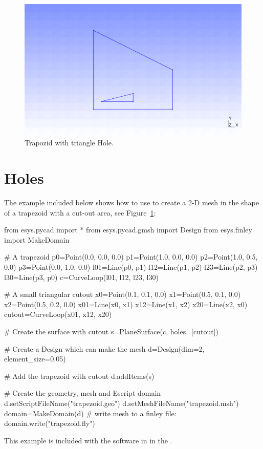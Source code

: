\begin{figure}
\centerline{\includegraphics[width=\figwidth]{figures/trap}}
\caption{Trapozid with triangle Hole.}
\label{fig:PYCAD 1}
\end{figure}


\section{Holes}
The example included below shows how to use \pycad to create a 2-D mesh
in the shape of a trapezoid with a cut-out area, see  Figure~\ref{fig:PYCAD 1}:
\begin{python}
from esys.pycad import *
from esys.pycad.gmsh import Design
from esys.finley import MakeDomain

# A trapezoid
p0=Point(0.0, 0.0, 0.0)
p1=Point(1.0, 0.0, 0.0)
p2=Point(1.0, 0.5, 0.0)
p3=Point(0.0, 1.0, 0.0)
l01=Line(p0, p1)
l12=Line(p1, p2)
l23=Line(p2, p3)
l30=Line(p3, p0)
c=CurveLoop(l01, l12, l23, l30)

# A small triangular cutout
x0=Point(0.1, 0.1, 0.0)
x1=Point(0.5, 0.1, 0.0)
x2=Point(0.5, 0.2, 0.0)
x01=Line(x0, x1)
x12=Line(x1, x2)
x20=Line(x2, x0)
cutout=CurveLoop(x01, x12, x20)

# Create the surface with cutout
s=PlaneSurface(c, holes=[cutout])

# Create a Design which can make the mesh
d=Design(dim=2, element_size=0.05)

# Add the trapezoid with cutout
d.addItems(s)

# Create the geometry, mesh and Escript domain
d.setScriptFileName("trapezoid.geo")
d.setMeshFileName("trapezoid.msh")
domain=MakeDomain(d)
# write mesh to a finley file:
domain.write("trapezoid.fly")
\end{python}
This example is included with the software in
 in the \ExampleDirectory. 

